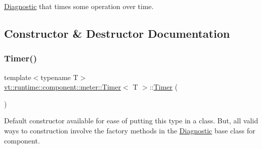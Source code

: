 \hyperlink{structvt_1_1runtime_1_1component_1_1_diagnostic}{Diagnostic} that times some operation over time. 

\subsection{Constructor \& Destructor Documentation}
\mbox{\label{structvt_1_1runtime_1_1component_1_1meter_1_1_timer_af32ee3397a43cd6af675904d70295211}} 
\subsubsection{\texorpdfstring{Timer()}{Timer()}\hspace{0.1cm}{\footnotesize\ttfamily [1/2]}}
{\footnotesize\ttfamily template$<$typename T$>$ \\
\hyperlink{structvt_1_1runtime_1_1component_1_1meter_1_1_timer}{vt\+::runtime\+::component\+::meter\+::\+Timer}$<$ T $>$\+::\hyperlink{structvt_1_1runtime_1_1component_1_1meter_1_1_timer}{Timer} (\begin{DoxyParamCaption}{ }\end{DoxyParamCaption})\hspace{0.3cm}{\ttfamily [default]}}



Default constructor available for ease of putting this type in a class. But, all valid ways to construction involve the factory methods in the {\ttfamily \hyperlink{structvt_1_1runtime_1_1component_1_1_diagnostic}{Diagnostic}} base class for component. 

\mbox{\label{structvt_1_1runtime_1_1component_1_1meter_1_1_timer_afc814a211d7354cad6e64783e1f8fe8a}} 
